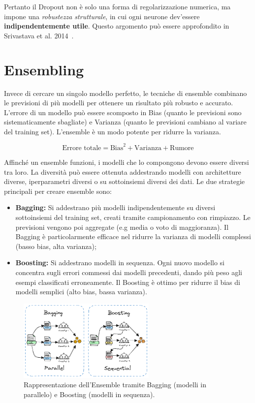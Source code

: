 Pertanto il Dropout non è solo una forma di regolarizzazione numerica, ma impone una \textit{robustezza strutturale}, in cui ogni neurone dev’essere \textbf{indipendentemente utile}. Questo argomento può essere approfondito in Srivastava et al. 2014~\cite{srivastava2014dropout}.

\section{Ensembling}
Invece di cercare un singolo modello perfetto, le tecniche di ensemble combinano le previsioni di più modelli per ottenere un risultato più robusto e accurato. L'errore di un modello può essere scomposto in Bias (quanto le previsioni sono sistematicamente sbagliate) e Varianza (quanto le previsioni cambiano al variare del training set). L'ensemble è un modo potente per ridurre la varianza.

\[
\text{Errore totale} = \text{Bias}^2 + \text{Varianza} + \text{Rumore}
\]

Affinché un ensemble funzioni, i modelli che lo compongono devono essere diversi tra loro. La diversità può essere ottenuta addestrando modelli con architetture diverse, iperparametri diversi o su sottoinsiemi diversi dei dati. Le due strategie principali per creare ensemble sono:

\begin{itemize}
  \item \textbf{Bagging:} Si addestrano più modelli indipendentemente su diversi sottoinsiemi del training set, creati tramite campionamento con rimpiazzo. Le previsioni vengono poi aggregate (e.g media o voto di maggioranza). Il Bagging è particolarmente efficace nel ridurre la varianza di modelli complessi (basso bias, alta varianza);
  \item \textbf{Boosting:} Si addestrano modelli in sequenza. Ogni nuovo modello si concentra sugli errori commessi dai modelli precedenti, dando più peso agli esempi classificati erroneamente. Il Boosting è ottimo per ridurre il bias di modelli semplici (alto bias, bassa varianza).
\end{itemize}

\begin{figure}
    \centering
    \includegraphics[width=0.6\textwidth]{figure/BagBoost.png}
    \caption{Rappresentazione dell’Ensemble tramite Bagging (modelli in parallelo) e Boosting (modelli in sequenza).}
    \label{fig:bagBoost}
\end{figure}

